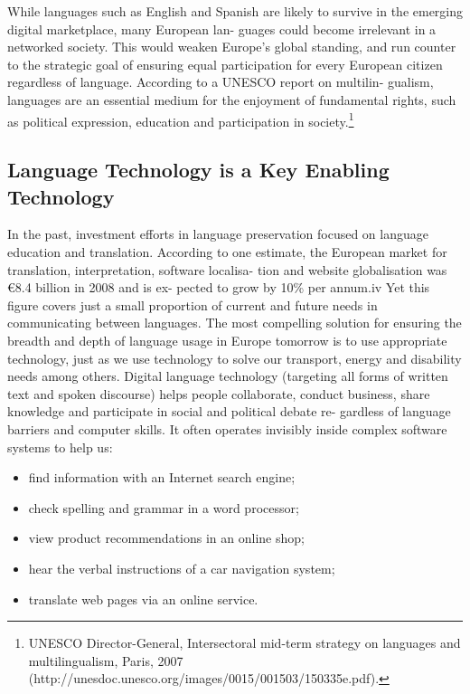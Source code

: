 \documentclass[]{../metanetpaper}
\begin{document}
 While languages such as English and Spanish are likely to
survive in the emerging digital marketplace, many European lan-
guages could become irrelevant in a networked society. This would
weaken Europe’s global standing, and run counter to the strategic
goal of ensuring equal participation for every European citizen
regardless of language. According to a UNESCO report on multilin-
gualism, languages are an essential medium for the enjoyment of
fundamental rights, such as political expression, education and
participation in society.\footnote{UNESCO Director-General, Intersectoral mid-term strategy on languages and multilingualism, Paris, 2007 (http://unesdoc.unesco.org/images/0015/001503/150335e.pdf).}
\subsection{Language Technology is a Key Enabling Technology}
In the past, investment efforts in language preservation focused on
language education and translation. According to one estimate, the
European market for translation, interpretation, software localisa-
tion and website globalisation was €8.4 billion in 2008 and is ex-
pected to grow by 10\% per annum.iv Yet this figure covers just a
small proportion of current and future needs in communicating
between languages.  The most compelling solution for ensuring the
breadth and depth of language usage in Europe tomorrow is to use appropriate technology, just as we use technology to solve our
transport, energy and disability needs among others.
Digital language technology (targeting all forms of written text and
spoken discourse) helps people collaborate, conduct business,
share knowledge and participate in social and political debate re-
gardless of language barriers and computer skills. It often operates
invisibly inside complex software systems to help us:
\begin{itemize}
\item find information with an Internet search engine;
\item check spelling and grammar in a word processor;
\item view product recommendations in an online shop;
\item hear the verbal instructions of a car navigation system;
\item translate web pages via an online service.
\end{itemize}
\end{document}
